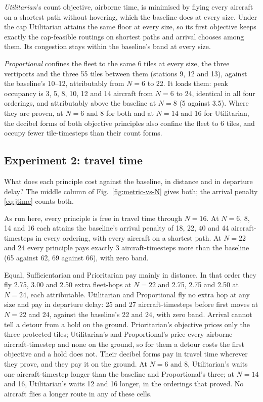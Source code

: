 \emph{Utilitarian}'s count objective, airborne time, is minimised by flying every aircraft
on a shortest path without hovering, which the baseline does at every size. Under the cap
Utilitarian attains the same floor at every size, so its first objective keeps exactly the
cap-feasible routings on shortest paths and arrival chooses among them. Its congestion
stays within the baseline's band at every size.

\emph{Proportional} confines the fleet to the same 6 tiles at every size, the three
vertiports and the three \SI{55}{\dBA} tiles between them (stations 9, 12 and 13),
against the baseline's 10--12, attributably from $N=6$ to 22. It loads them: peak
occupancy is 3, 5, 8, 10, 12 and 14 aircraft from $N=6$ to 24, identical in all four
orderings, and attributably above the baseline at $N=8$ (5 against 3.5). Where they are
proven, at $N=6$ and 8 for both and at $N=14$ and 16 for Utilitarian, the decibel forms
of both objective principles also confine the fleet to 6 tiles, and occupy fewer
tile-timesteps than their count forms.

\subsection{Experiment 2: travel time}
\label{sec:travel}

What does each principle cost against the baseline, in distance and in departure delay?
The middle column of Fig.~\ref{fig:metric-vs-N} gives both; the arrival penalty
\eqref{eq:jtime} counts both.

As run here, every principle is free in travel time through $N=16$. At $N=6$, 8, 14 and
16 each attains
the baseline's arrival penalty of 18, 22, 40 and 44 aircraft-timesteps in every ordering,
with every aircraft on a shortest path. At $N=22$ and 24 every principle pays exactly 3
aircraft-timesteps more than the baseline (65 against 62, 69 against 66), with zero band.

Equal, Sufficientarian and Prioritarian pay mainly in distance. In that order they fly
2.75, 3.00 and 2.50 extra fleet-hops at $N=22$ and 2.75, 2.75 and 2.50 at $N=24$, each
attributable. Utilitarian and Proportional fly no extra hop at any size and pay in
departure delay: 25 and 27 aircraft-timesteps before first moves at $N=22$ and 24, against
the baseline's 22 and 24, with zero band. Arrival cannot tell a detour from a hold on the
ground. Prioritarian's objective prices only the three protected tiles;
Utilitarian's and Proportional's price every airborne aircraft-timestep and none on the
ground, so for them a detour costs the first objective and a hold does not. Their decibel forms pay in
travel time wherever they prove, and they pay it on the ground. At $N=6$ and 8,
Utilitarian's waits one aircraft-timestep longer than the baseline and Proportional's
three; at $N=14$ and 16, Utilitarian's waits 12 and 16 longer, in the orderings that
proved. No aircraft flies a longer route in any of these cells.

